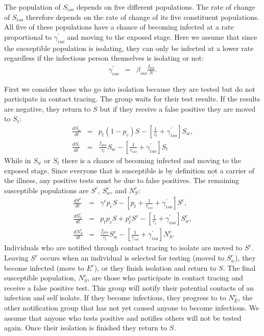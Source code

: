 \documentclass[notitlepage, superscriptaddress]{revtex4-2}
\begin{document}
The population of $S_{iso}$ depends on five different populations. The rate of change of $S_{iso}$ therefore depends on the rate of change of its five constituent populations. All five of these populations have a chance of becoming infected at a rate proportional to $\gamma^{'}_{iso}$ and moving to the exposed stage. Here we assume that since the sucseptible population is isolating, they can only be infected at a lower rate regardless if the infectious person themselves is isolating or not:
\begin{eqnarray}
\label{E:infectionratesPrime}
\gamma^{'}_{iso} &=& \beta_{iso} \frac{I_{tot}}{N}.
\end{eqnarray}

First we consider those who go into isolation because they are tested but do not participate in contact tracing. The group waits for their test results. If the results are negative, they return to $S$ but if they receive a false positive they are moved to $S_{t}$:
\begin{eqnarray}
\label{E:dS_iso}
\frac{dS_{w}}{dt} &=& p_{t} (1 -p_{c}) S - [\frac{1}{\tau_{t}}  + \gamma^{'}_{iso}] S_{w}, \\
%
\frac{dS_{t}}{dt} &=& \frac{f_{pos}}{\tau_{t}} S_{w} - [\frac{1}{\tau_{iso}}  + \gamma^{'}_{iso}] S_{t}
\end{eqnarray}
While in $S_{w}$ or $S_{t}$ there is a chance of becoming infected and moving to the exposed stage. Since everyone that is susceptible is by definition not a carrier of the illness, any positive tests must be due to false positives. The remaining susceptible populations are $S^{c}$, $S^{c}_{w}$, and $N^{c}_{S}$:
\begin{eqnarray}
\label{E:dSc}
 \frac{dS^{c}}{dt} &=& \gamma^{c} p_{c} S -[p_{t} +\frac{1}{\tau_{iso}} +\gamma^{'}_{iso}] S^{c}, \\
 \frac{dS^{c}_{w}}{dt} &=& p_{t}p_{c} S + p^{c}_{t} S^{c} - [\frac{1}{\tau_{t}} + \gamma^{'}_{iso}] S^{c}_{w}, \\ 
 \frac{dN^{c}_{S}}{dt} &=& \frac{f_{pos}}{\tau_{t}} S^{c}_{w} - [\frac{1}{\tau_{iso}}  + \gamma^{'}_{iso}] N^{c}_{S}.  
\end{eqnarray}
Individuals who are notified through contact tracing to isolate are moved to $S^{c}$. Leaving $S^{c}$ occurs when an individual is selected for testing (moved to $S^{c}_{w}$), they become infected (move to $E^{c}$), or they finish isolation and return to $S$. The final susceptible population, $N^{c}_{S}$, are those who participate in contact tracing and receive a false positive test. This group will notify their potential contacts of an infection and self isolate. If they become infectious, they progress to to $N^{c}_{E}$, the other notification group that has not yet caused anyone to become infectious. We assume that anyone who tests positive and notifies others will not be tested again. Once their isolation is finished they return to $S$.
\end{document}
